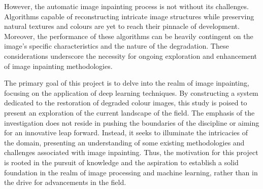 However, the automatic image inpainting process is not without its challenges. Algorithms capable of reconstructing intricate image structures while preserving natural textures and colours are yet to reach their pinnacle of development. Moreover, the performance of these algorithms can be heavily contingent on the image's specific characteristics and the nature of the degradation. These considerations underscore the necessity for ongoing exploration and enhancement of image inpainting methodologies.


The primary goal of this project is to delve into the realm of image inpainting, focusing on the application of deep learning techniques. By constructing a system dedicated to the restoration of degraded colour images, this study is poised to present an exploration of the current landscape of the field. The emphasis of the investigation does not reside in pushing the boundaries of the discipline or aiming for an innovative leap forward. Instead, it seeks to illuminate the intricacies of the domain, presenting an understanding of some existing methodologies and challenges associated with image inpainting. Thus, the motivation for this project is rooted in the pursuit of knowledge and the aspiration to establish a solid foundation in the realm of image processing and machine learning, rather than in the drive for advancements in the field.

